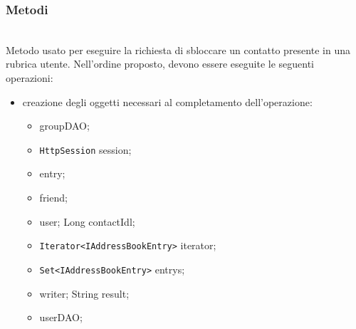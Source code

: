 \subsubsection*{Metodi}

\begin{description}
	\item{}\\	
	Metodo usato per eseguire la richiesta di sbloccare un contatto presente in una rubrica utente. Nell'ordine proposto, devono essere eseguite le seguenti operazioni:
	\begin{itemize}
		\item creazione degli oggetti necessari al completamento dell'operazione:
		\begin{itemize}
			\item {} groupDAO;
			\item \texttt{HttpSession} session;
			\item {} entry;
			\item {} friend;
			\item {} user;
			Long contactIdl;
			\item \texttt{Iterator<IAddressBookEntry>} iterator;
			\item \texttt{Set<IAddressBookEntry>} entrys;
			\item {} writer;
			String result;
			\item {} userDAO;
		\end{itemize}
		

\end{itemize}
\end{description}
